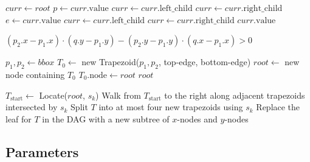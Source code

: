 \begin{algorithm}[htbp]
\caption{Trapezoidal Map Query}
\label{alg:trapezoidal_locate}
\begin{algorithmic}[1]
  \State $curr \gets root$
      \State $p \gets curr.\text{value}$ 
        \State $curr \gets curr.\text{left\_child}$
      \Else
        \State $curr \gets curr.\text{right\_child}$
      \EndIf
    \Else {}
      \State $e \gets curr.\text{value}$ 
        \State $curr \gets curr.\text{left\_child}$
      \Else
        \State $curr \gets curr.\text{right\_child}$
      \EndIf
    \EndIf
  \EndWhile
  \State \Return $curr.\text{value}$ 
\EndFunction

  \State \Return $(p_2.x - p_1.x) \cdot (q.y - p_1.y) - (p_2.y - p_1.y) \cdot (q.x - p_1.x) > 0$
\EndFunction
\end{algorithmic}
\end{algorithm}

\begin{algorithm}[htbp]
\caption{Trapezoidal Map Construction (Incremental)}
\label{alg:trapezoidal_build}
\begin{algorithmic}[1]
  \State $p_1, p_2 \gets bbox$ 
  \State $T_0 \gets$ new Trapezoid($p_1, p_2$, top-edge, bottom-edge)
  \State $root \gets$ new node containing $T_0$
  \State $T_0.\text{node} \gets root$
  \State \Return $root$
\EndFunction

  \State $T_{\text{start}} \gets$ Locate($root$, $s_k$)
  \State Walk from $T_{\text{start}}$ to the right along adjacent trapezoids intersected by $s_k$
    \State Split $T$ into at most four new trapezoids using $s_k$
    \State Replace the leaf for $T$ in the DAG with a new subtree of $x$-nodes and $y$-nodes
  \EndFor
\EndFunction
\end{algorithmic}
\end{algorithm}

\subsection{Parameters}

